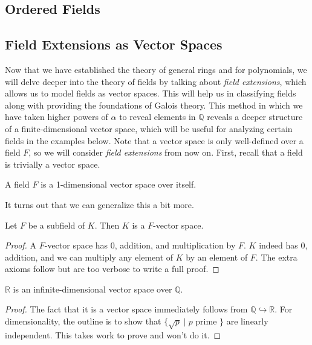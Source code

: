 \subsection{Ordered Fields}

\subsection{Field Extensions as Vector Spaces}

  Now that we have established the theory of general rings and for polynomials, we will delve deeper into the theory of fields by talking about \textit{field extensions}, which allows us to model fields as vector spaces. This will help us in classifying fields along with providing the foundations of Galois theory. This method in which we have taken higher powers of $\alpha$ to reveal elements in $\mathbb{Q}$ reveals a deeper structure of a finite-dimensional vector space, which will be useful for analyzing certain fields in the examples below. Note that a vector space is only well-defined over a field $F$, so we will consider \textit{field extensions} from now on. First, recall that a field is trivially a vector space. 

  \begin{lemma}
    A field $F$ is a 1-dimensional vector space over itself. 
  \end{lemma} 

  It turns out that we can generalize this a bit more. 

  \begin{theorem}
    \label{thm:fields_vector_space}
    Let $F$ be a subfield of $K$. Then $K$ is a $F$-vector space. 
  \end{theorem}
  \begin{proof}
    A $F$-vector space has $0$, addition, and multiplication by $F$. $K$ indeed has $0$, addition, and we can multiply any element of $K$ by an element of $F$. The extra axioms follow but are too verbose to write a full proof. 
  \end{proof}

  \begin{corollary} 
    $\mathbb{R}$ is an infinite-dimensional vector space over $\mathbb{Q}$. 
  \end{corollary}
  \begin{proof}
    The fact that it is a vector space immediately follows from $\mathbb{Q} \hookrightarrow \mathbb{R}$. For dimensionality, the outline is to show that $\{\sqrt{p} \mid p \text{ prime }\}$ are linearly independent. This takes work to prove and won't do it. 
  \end{proof}

